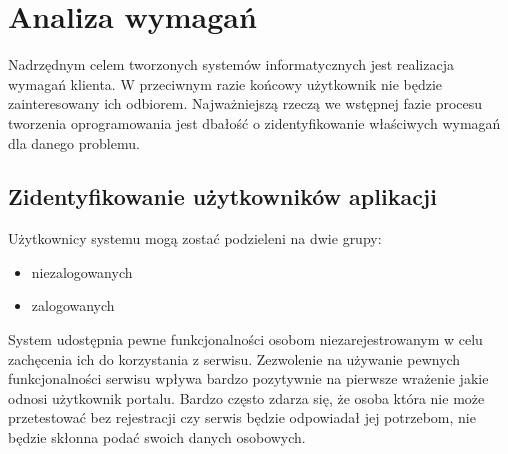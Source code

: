\chapter{Analiza wymagań}
\label{cha:inzyneriaWymagan}
Nadrzędnym celem tworzonych systemów informatycznych jest realizacja wymagań klienta. W przeciwnym razie końcowy użytkownik nie będzie zainteresowany ich odbiorem. Najważniejszą rzeczą we wstępnej fazie procesu tworzenia oprogramowania jest dbałość o zidentyfikowanie właściwych wymagań dla danego problemu.


\section{Zidentyfikowanie użytkowników aplikacji}
\label{sec:uzytkownicy}
Użytkownicy systemu mogą zostać podzieleni na dwie grupy:
\begin{itemize}
\item niezalogowanych
\item zalogowanych
\end{itemize}
System udostępnia pewne funkcjonalności osobom niezarejestrowanym w celu zachęcenia ich do korzystania z serwisu. Zezwolenie na używanie pewnych funkcjonalności serwisu wpływa bardzo pozytywnie na pierwsze wrażenie jakie odnosi użytkownik portalu. Bardzo często zdarza się, że osoba która nie może przetestować bez rejestracji czy serwis będzie odpowiadał jej potrzebom, nie będzie skłonna podać swoich danych osobowych.


